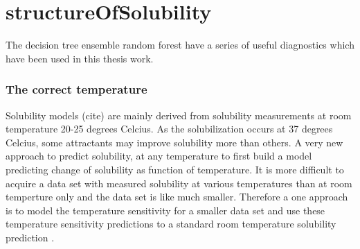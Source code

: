 \chapter{structureOfSolubility}

The decision tree ensemble random forest have a series of useful diagnostics which have been used in this thesis work.




\subsection{The correct temperature}
Solubility models (cite) are mainly derived from solubility measurements at room temperature 20-25 degrees Celcius. As the solubilization occurs at 37 degrees Celcius, some attractants may improve solubility more than others. A very new approach to predict solubility, at any temperature to first build a model predicting change of solubility as function of temperature. It is more difficult to acquire a data set with measured solubility at various temperatures than at room temperture only and the data set is like much smaller. Therefore a one approach is to model the temperature sensitivity for a smaller data set and use these temperature sensitivity predictions to a standard room temperature solubility prediction \cite{klimenko2016novel}.